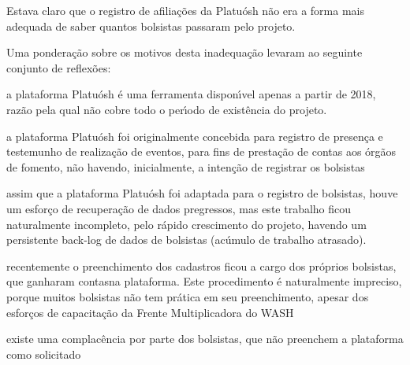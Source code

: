 \documentclass[
12pt,		%
openright,	%
twoside,  %
a4paper,			%
chapter=TITLE,		%
english,			%
french,				%
spanish,			%
brazil				%
]{USPSC-classe/USPSC}
\begin{document}
Estava claro que o registro de afilia\c{c}\~oes da Platu\'osh n\~ao era a forma mais adequada de saber quantos bolsistas passaram pelo projeto.





























Uma pondera\c{c}\~ao sobre os motivos desta inadequa\c{c}\~ao levaram ao seguinte conjunto de reflex\~oes:















\begin{alineas}
\item a plataforma Platu\'osh \'e uma ferramenta dispon\'{\i}vel apenas a partir de 2018, raz\~ao pela qual n\~ao cobre todo o per\'{\i}odo de exist\^encia do projeto.
\item a plataforma Platu\'osh foi originalmente concebida para registro de presen\c{c}a e testemunho de realiza\c{c}\~ao de eventos, para fins de presta\c{c}\~ao de contas aos \'org\~aos de fomento, n\~ao havendo, inicialmente, a inten\c{c}\~ao de registrar os bolsistas
\item assim que a plataforma Platu\'osh foi adaptada para o registro de bolsistas, houve um esfor\c{c}o de recupera\c{c}\~ao de dados pregressos, mas este trabalho ficou naturalmente incompleto, pelo r\'apido crescimento do projeto, havendo um persistente back-log de dados de bolsistas (ac\'umulo de trabalho atrasado).
\item recentemente o preenchimento dos cadastros ficou a cargo dos pr\'oprios bolsistas, que ganharam \textquotedbl contas\textquotedbl  na plataforma. Este procedimento \'e naturalmente impreciso, porque muitos bolsistas n\~ao tem pr\'atica em seu preenchimento, apesar dos esfor\c{c}os de capacita\c{c}\~ao da Frente Multiplicadora do WASH
\item existe uma complac\^encia por parte dos bolsistas, que n\~ao preenchem a plataforma como solicitado
\end{alineas}
\end{document}
